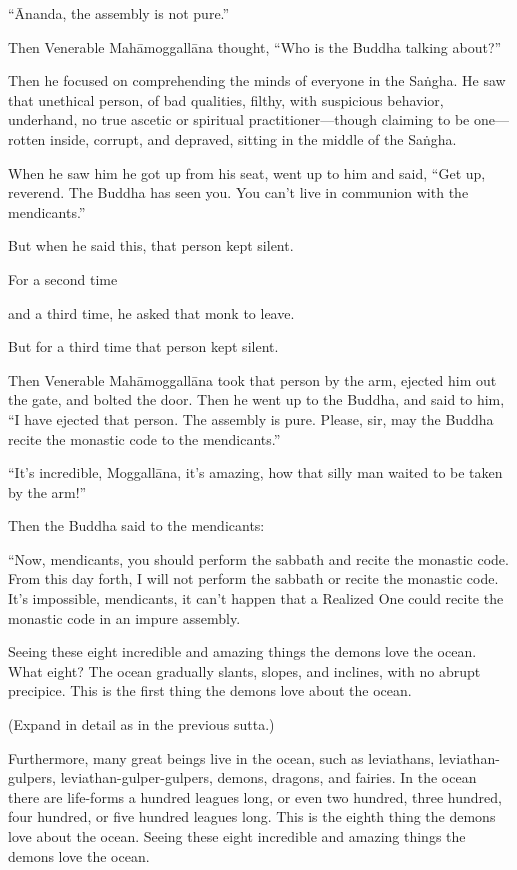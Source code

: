 \documentclass[12pt,openany]{book}%
\begin{document}
“Ānanda, the assembly is not pure.” 

Then Venerable \textsanskrit{Mahāmoggallāna} thought, “Who is the Buddha talking about?” 

Then he focused on comprehending the minds of everyone in the \textsanskrit{Saṅgha}. He saw that unethical person, of bad qualities, filthy, with suspicious behavior, underhand, no true ascetic or spiritual practitioner—though claiming to be one—rotten inside, corrupt, and depraved, sitting in the middle of the \textsanskrit{Saṅgha}. 

When he saw him he got up from his seat, went up to him and said, “Get up, reverend. The Buddha has seen you. You can’t live in communion with the mendicants.” 

But when he said this, that person kept silent. 

For a second time 

and a third time, he asked that monk to leave. 

But for a third time that person kept silent. 

Then Venerable \textsanskrit{Mahāmoggallāna} took that person by the arm, ejected him out the gate, and bolted the door. Then he went up to the Buddha, and said to him, “I have ejected that person. The assembly is pure. Please, sir, may the Buddha recite the monastic code to the mendicants.” 

“It’s incredible, \textsanskrit{Moggallāna}, it’s amazing, how that silly man waited to be taken by the arm!” 

Then the Buddha said to the mendicants: 

“Now, mendicants, you should perform the sabbath and recite the monastic code. From this day forth, I will not perform the sabbath or recite the monastic code. It’s impossible, mendicants, it can’t happen that a Realized One could recite the monastic code in an impure assembly. 

Seeing these eight incredible and amazing things the demons love the ocean. What eight? The ocean gradually slants, slopes, and inclines, with no abrupt precipice. This is the first thing the demons love about the ocean. 

(Expand in detail as in the previous sutta.) 

Furthermore, many great beings live in the ocean, such as leviathans, leviathan-gulpers, leviathan-gulper-gulpers, demons, dragons, and fairies. In the ocean there are life-forms a hundred leagues long, or even two hundred, three hundred, four hundred, or five hundred leagues long. This is the eighth thing the demons love about the ocean. Seeing these eight incredible and amazing things the demons love the ocean. 
\end{document}
